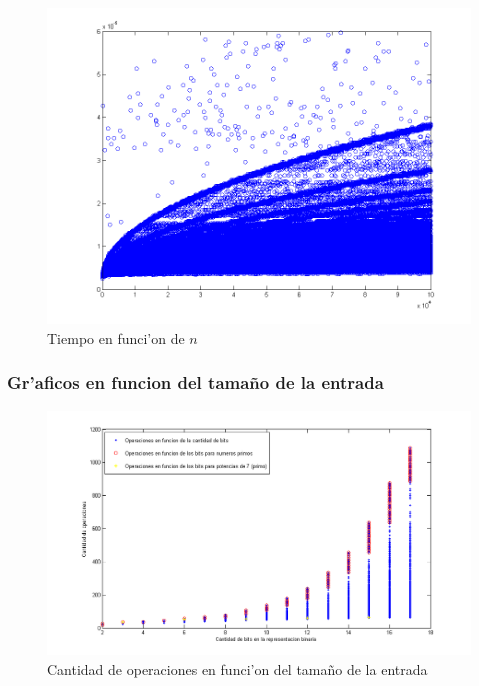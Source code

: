 \begin{figure}[H]
\centering
\includegraphics[scale=0.5]{../../codigo/ejercicio1/benchmark_de_tiempo/graficos/todos_los_numeros/todosLosNumerosPuntosTiempo.png}
\caption{Tiempo en funci'on de $n$}
\end{figure}

\subsubsection{Gr'aficos en funcion del tama\~{n}o de la entrada}
\begin{figure}[H]
\centering
\includegraphics[scale=0.7]{../../codigo/ejercicio1/benchmark/graficos/tamanio_Entrada_T/operacionesEntrada.png}
\caption{Cantidad de operaciones en funci'on del tama\~{n}o de la entrada}
\end{figure}

